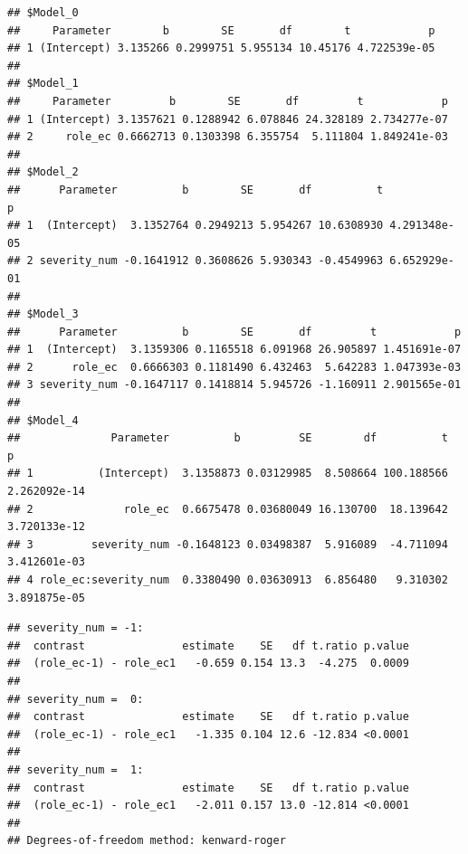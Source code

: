 \documentclass[
]{article}
\newenvironment{Shaded}{\begin{snugshade}}{\end{snugshade}}
\newcommand{\AttributeTok}[1]{\textcolor[rgb]{0.13,0.29,0.53}{#1}}
\newcommand{\CommentTok}[1]{\textcolor[rgb]{0.56,0.35,0.01}{\textit{#1}}}
\newcommand{\DecValTok}[1]{\textcolor[rgb]{0.00,0.00,0.81}{#1}}
\newcommand{\FunctionTok}[1]{\textcolor[rgb]{0.13,0.29,0.53}{\textbf{#1}}}
\newcommand{\NormalTok}[1]{#1}
\newcommand{\OtherTok}[1]{\textcolor[rgb]{0.56,0.35,0.01}{#1}}
\newcommand{\SpecialCharTok}[1]{\textcolor[rgb]{0.81,0.36,0.00}{\textbf{#1}}}
\newcommand{\StringTok}[1]{\textcolor[rgb]{0.31,0.60,0.02}{#1}}
\begin{document}
\begin{verbatim}
## $Model_0
##     Parameter        b        SE       df        t            p
## 1 (Intercept) 3.135266 0.2999751 5.955134 10.45176 4.722539e-05
## 
## $Model_1
##     Parameter         b        SE       df         t            p
## 1 (Intercept) 3.1357621 0.1288942 6.078846 24.328189 2.734277e-07
## 2     role_ec 0.6662713 0.1303398 6.355754  5.111804 1.849241e-03
## 
## $Model_2
##      Parameter          b        SE       df          t            p
## 1  (Intercept)  3.1352764 0.2949213 5.954267 10.6308930 4.291348e-05
## 2 severity_num -0.1641912 0.3608626 5.930343 -0.4549963 6.652929e-01
## 
## $Model_3
##      Parameter          b        SE       df         t            p
## 1  (Intercept)  3.1359306 0.1165518 6.091968 26.905897 1.451691e-07
## 2      role_ec  0.6666303 0.1181490 6.432463  5.642283 1.047393e-03
## 3 severity_num -0.1647117 0.1418814 5.945726 -1.160911 2.901565e-01
## 
## $Model_4
##              Parameter          b         SE        df          t            p
## 1          (Intercept)  3.1358873 0.03129985  8.508664 100.188566 2.262092e-14
## 2              role_ec  0.6675478 0.03680049 16.130700  18.139642 3.720133e-12
## 3         severity_num -0.1648123 0.03498387  5.916089  -4.711094 3.412601e-03
## 4 role_ec:severity_num  0.3380490 0.03630913  6.856480   9.310302 3.891875e-05
\end{verbatim}

\begin{Shaded}
\end{Shaded}

\begin{verbatim}
## severity_num = -1:
##  contrast               estimate    SE   df t.ratio p.value
##  (role_ec-1) - role_ec1   -0.659 0.154 13.3  -4.275  0.0009
## 
## severity_num =  0:
##  contrast               estimate    SE   df t.ratio p.value
##  (role_ec-1) - role_ec1   -1.335 0.104 12.6 -12.834 <0.0001
## 
## severity_num =  1:
##  contrast               estimate    SE   df t.ratio p.value
##  (role_ec-1) - role_ec1   -2.011 0.157 13.0 -12.814 <0.0001
## 
## Degrees-of-freedom method: kenward-roger
\end{verbatim}
\end{document}
